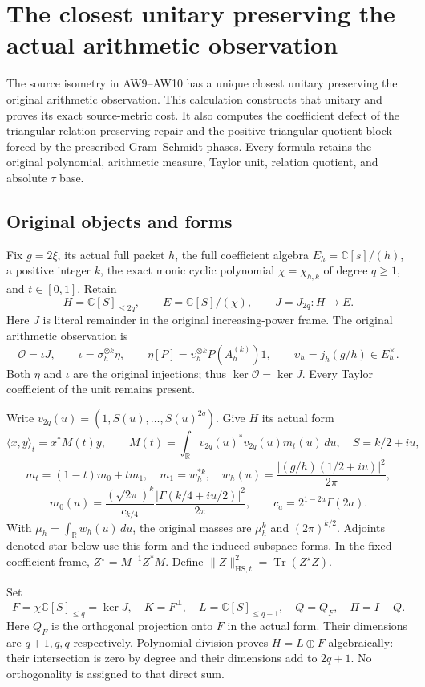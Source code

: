 \section{The closest unitary preserving the actual arithmetic observation}
\label{sec:vr-polar-repair}

The source isometry in AW9--AW10 has a unique closest unitary preserving the original arithmetic observation. This calculation constructs that unitary and proves its exact source-metric cost. It also computes the coefficient defect of the triangular relation-preserving repair and the positive triangular quotient block forced by the prescribed Gram--Schmidt phases. Every formula retains the original polynomial, arithmetic measure, Taylor unit, relation quotient, and absolute \(\tau\) base.

\subsection{Original objects and forms}

Fix \(g=2\xi\), its actual full packet \(h\), the full coefficient algebra \(E_h=\mathbb C[s]/(h)\), a positive integer \(k\), the exact monic cyclic polynomial \(\chi=\chi_{h,k}\) of degree \(q\ge1\), and \(t\in[0,1]\). Retain
\[
 H=\mathbb C[S]_{\le2q},\qquad E=\mathbb C[S]/(\chi),\qquad
 J=J_{2q}:H\longrightarrow E.
\]
Here \(J\) is literal remainder in the original increasing-power frame. The original arithmetic observation is
\[
 \mathcal O=\iota J,\qquad \iota=\sigma_h^{\otimes k}\eta,\qquad
 \eta[P]=\upsilon_h^{\otimes k}P(A_h^{(k)})1,\qquad
 \upsilon_h=j_h(g/h)\in E_h^\times.
\]
Both \(\eta\) and \(\iota\) are the original injections; thus \(\ker\mathcal O=\ker J\). Every Taylor coefficient of the unit remains present.

Write \(v_{2q}(u)=(1,S(u),\ldots,S(u)^{2q})\). Give \(H\) its actual form
\[
 \langle x,y\rangle_t=x^*M(t)y,\qquad
 M(t)=\int_{\mathbb R}v_{2q}(u)^*v_{2q}(u)m_t(u)\,du,\quad
 S=k/2+iu,
\]
\[
 m_t=(1-t)m_0+tm_1,\quad m_1=w_h^{*k},\quad
 w_h(u)=\frac{|(g/h)(1/2+iu)|^2}{2\pi},
\]
\[
 m_0(u)=\frac{(\sqrt{2\pi})^k}{c_{k/4}}
 \frac{|\Gamma(k/4+iu/2)|^2}{2\pi},\qquad
 c_a=2^{1-2a}\Gamma(2a).
\]
With \(\mu_h=\int_{\mathbb R}w_h(u)\,du\), the original masses are \(\mu_h^k\) and \((2\pi)^{k/2}\). Adjoints denoted star below use this form and the induced subspace forms. In the fixed coefficient frame,
\(Z^\star=M^{-1}Z^*M\). Define
\(\|Z\|_{\mathrm{HS},t}^2=\operatorname{Tr}(Z^\star Z)\).

Set
\[
 F=\chi\mathbb C[S]_{\le q}=\ker J,\quad K=F^\perp,\quad
 L=\mathbb C[S]_{\le q-1},\quad Q=Q_F,\quad \Pi=I-Q.
 \tag{VR1}
\]
Here \(Q_F\) is the orthogonal projection onto \(F\) in the actual form. Their dimensions are \(q+1,q,q\) respectively. Polynomial division proves \(H=L\oplus F\) algebraically: their intersection is zero by degree and their dimensions add to \(2q+1\). No orthogonality is assigned to that direct sum.

